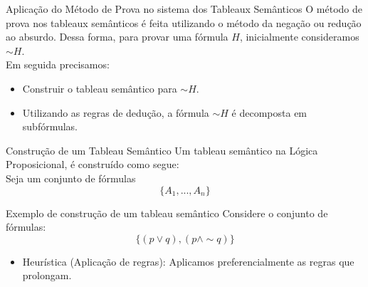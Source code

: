 \begin{frame}{Aplicação do Método de Prova no sistema dos Tableaux Semânticos}
O método de prova nos tableaux semânticos é feita utilizando o método da negação ou redução ao absurdo. Dessa forma, para provar uma fórmula $H$, inicialmente consideramos $\sim H$. \\ Em seguida precisamos:

\begin{itemize}
\item Construir o tableau semântico para $\sim H$.
\item Utilizando as regras de dedução, a fórmula $\sim H$ é decomposta em subfórmulas.
\end{itemize}
\end{frame}

\begin{frame}{Construção de um Tableau Semântico}
Um tableau semântico na Lógica Proposicional, é construído como segue:\\
\vspace{0,7 cm}
Seja um conjunto de fórmulas $$\{ A_1,..., A_n\} $$
\end{frame}

\begin{frame}{Exemplo de construção de um tableau semântico}
Considere o conjunto de fórmulas:\\
$$\{ (p \vee q),(p \wedge \sim q)\}$$
\centering


\vspace{0,7 cm}
\begin{itemize}
\item Heurística (Aplicação de regras): Aplicamos preferencialmente as regras que prolongam.
\end{itemize}
\end{frame}

